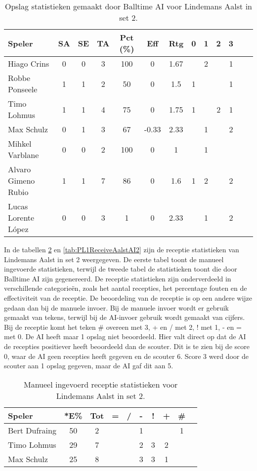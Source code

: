 \begin{table}[ht!]
  \centering
  \scriptsize
  \begin{tabular}{|l|c|c|c|c|c|c|c|c|c|c|c|c|} \hline
    \textbf{Speler} & SA & SE & TA & Pct (\%) & Eff & Rtg & 0 & 1 & 2 & 3 \\ \hline
    Hiago Crins & 0 & 0 & 3 & 100 & 0 & 1.67 &  & 2 &  & 1 \\
    Robbe Ponseele & 1 & 1 & 2 & 50 & 0 & 1.5 & 1 &  &  & 1  \\
    Timo Lohmus & 1 & 1 & 4 & 75 & 0 & 1.75 & 1 & & 2 & 1 \\
    Max Schulz & 0 & 1 & 3 & 67 & -0.33 & 2.33 &  & 1 &  & 2 \\
    Mihkel Varblane & 0 & 0 & 2 & 100 & 0 & 1 &  & 1 &  &   \\
    Alvaro Gimeno Rubio & 1 & 1 & 7 & 86 & 0 & 1.6 & 1 & 2 &  & 2  \\
    Lucas Lorente López & 0 & 0 & 3 & 1 & 0 & 2.33 &  & 1 &  & 2  \\ \hline
  \end{tabular}
  \caption[Opslag statistieken gemaakt door Balltime AI voor Lindemans Aalst in set 2]{\label{tab:PL1ServeAalstAI2}Opslag statistieken gemaakt door Balltime AI voor Lindemans Aalst in set 2.}
\end{table}

In de tabellen \ref{tab:PL1ReceiveAalstMan2} en \ref{tab:PL1ReceiveAalstAI2} zijn de receptie statistieken van Lindemans Aalst in set 2 weergegeven. De eerste tabel toont de manueel ingevoerde statistieken, terwijl de tweede tabel de statistieken toont die door Balltime AI zijn gegenereerd. De receptie statistieken zijn onderverdeeld in verschillende categorieën, zoals het aantal recepties, het percentage fouten en de effectiviteit van de receptie. De beoordeling van de receptie is op een andere wijze gedaan dan bij de manuele invoer. Bij de manuele invoer wordt er gebruik gemaakt van tekens, terwijl bij de AI-invoer gebruik wordt gemaakt van cijfers. Bij de receptie komt het teken \# overeen met 3, + en / met 2, ! met 1, - en = met 0. De AI heeft maar 1 opslag niet beoordeeld. Hier valt direct op dat de AI de recepties positiever heeft beoordeeld dan de scouter. Dit is te zien bij de score 0, waar de AI geen recepties heeft gegeven en de scouter 6. Score 3 werd door de scouter aan 1 opslag gegeven, maar de AI gaf dit aan 5.

\begin{table}[ht!]
  \centering
  \scriptsize
    \begin{tabular}{|l|c|c|c|c|c|c|c|c|c|}
      \hline
      \textbf{Speler} & *E\% & Tot & = & / & - & ! & + & \# \\ \hline
      Bert Dufraing  & 50 & 2 &  &  & 1 &  &  & 1 \\ 
      Timo Lohmus  & 29 & 7 &  & & 2 & 3 & 2 &    \\
      Max Schulz  & 25 & 8 &  &  & 3 & 3 & 1 &   \\ \hline
  \end{tabular}
  \caption[Manueel ingevoerd receptie statistieken voor Lindemans Aalst in set 2]{\label{tab:PL1ReceiveAalstMan2}Manueel ingevoerd receptie statistieken voor Lindemans Aalst in set 2.}
\end{table}


